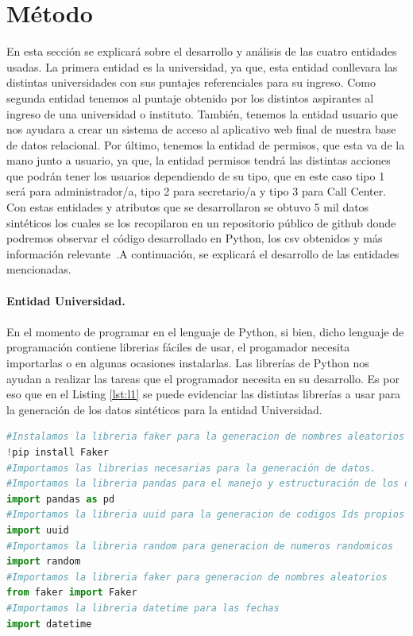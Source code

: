 \documentclass[10pt, oneside,spanish]{article}   	%
\begin{document}
\section {Método}
En esta sección se explicará sobre el desarrollo y análisis de las cuatro entidades usadas. La primera entidad es la universidad, ya que, esta entidad conllevara las distintas universidades con sus puntajes referenciales para su ingreso. Como segunda entidad tenemos al puntaje obtenido por los distintos aspirantes al ingreso de una universidad o instituto. También, tenemos la entidad usuario que nos ayudara a crear un sistema de acceso al aplicativo web final de nuestra base de datos relacional. Por último, tenemos la entidad de permisos, que esta va de la mano junto a usuario, ya que, la entidad permisos tendrá las distintas acciones que podrán tener los usuarios dependiendo de su tipo, que en este caso tipo 1 será para administrador/a, tipo 2 para secretario/a y tipo 3 para Call Center. Con estas entidades y atributos que se desarrollaron se obtuvo 5 mil datos sintéticos los cuales se los recopilaron en un repositorio público de github donde podremos observar el código desarrollado en Python, los csv obtenidos y más información relevante~\cite{emilio}.A continuación, se explicará el desarrollo de las entidades mencionadas.
\\
\\
\textbf{Entidad Universidad.}\\
\\En el momento de programar en el lenguaje de Python, si bien, dicho lenguaje de programación contiene librerias fáciles de usar, el progamador necesita importarlas o en algunas ocasiones instalarlas. Las librerías de Python nos ayudan a realizar las tareas que el programador necesita en su desarrollo. Es por eso que en el Listing \ref{lst:l1} se puede evidenciar las distintas librerías a usar para la generación de los datos sintéticos para la entidad Universidad.
\begin{lstlisting}[language=Python,label={lst:l1},caption=Librerías a utilizar en la entidad Universidad,frame=single, ]
#Instalamos la libreria faker para la generacion de nombres aleatorios
!pip install Faker
#Importamos las librerias necesarias para la generación de datos.
#Importamos la libreria pandas para el manejo y estructuración de los datos sinteticos
import pandas as pd
#Importamos la libreria uuid para la generacion de codigos Ids propios
import uuid
#Importamos la libreria random para generacion de numeros randomicos
import random
#Importamos la libreria faker para generacion de nombres aleatorios
from faker import Faker
#Importamos la libreria datetime para las fechas
import datetime
\end{lstlisting}
\end{document}
